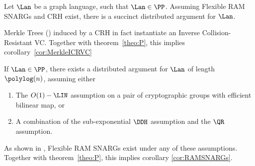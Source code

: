 \begin{corollary}\label{cor:MerkleICRVC}
    Let $\Lan$ be a graph language, such that $\Lan\in \PP$. Assuming Flexible RAM SNARGs and CRH exist, there is a succinct distributed argument for $\Lan$.  
\end{corollary}
Merkle Trees (\cite{merkle1989certified}) induced by a CRH in fact instantiate an Inverse Collision-Resistant VC. Together with theorem~\ref{theo:P}, this implies corollary~\ref{cor:MerkleICRVC}

\begin{corollary}\label{cor:RAMSNARGs}
    If $\Lan\in\PP$, there exists a distributed argument for $\Lan$ of length $\polylog(n)$, assuming either
    \begin{enumerate}
        \item The $O(1)-\LIN$ assumption on a pair of cryptographic groups with efficient bilinear map, or
        \item A combination of the sub-exponential $\DDH$ assumption and the $\QR$ assumption.
    \end{enumerate}
\end{corollary}
As shown in  \cite{cryptoeprint:2022/1320}, Flexible RAM SNARGs exist under any of these assumptions. Together with theorem~\ref{theo:P}, this implies corollary \ref{cor:RAMSNARGs}.
